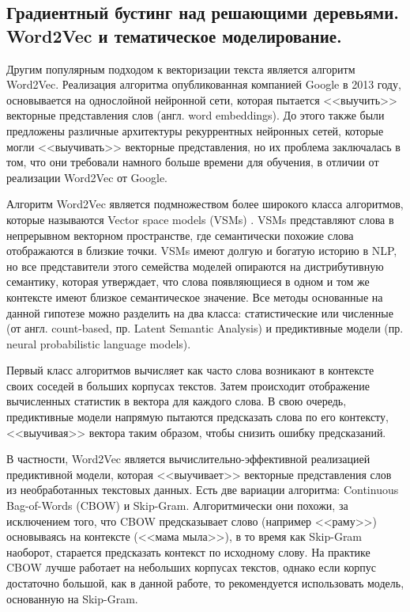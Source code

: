 \documentclass[a4paper, 14pt]{extarticle}
\begin{document}
\subsection{Градиентный бустинг над решающими деревьями. Word2Vec и тематическое моделирование.}
Другим популярным подходом к векторизации текста является алгоритм Word2Vec.
Реализация алгоритма опубликованная компанией Google \cite{DBLP:journals/corr/abs-1301-3781} в 2013 году,
основывается на однослойной нейронной сети, которая пытается <<выучить>> векторные представления слов (англ. word embeddings).
До этого также были предложены различные архитектуры рекуррентных нейронных сетей, которые могли <<выучивать>> векторные 
представления, но их проблема заключалась в том, что они требовали намного больше времени для обучения, в отличии от реализации 
Word2Vec от Google.

Алгоритм Word2Vec является подмножеством более широкого класса алгоритмов, которые называются Vector space models (VSMs) 
\cite{Salton:1975:VSM:361219.361220}. VSMs представляют слова в непрерывном векторном пространстве, где семантически похожие
слова отображаются в близкие точки. VSMs имеют долгую и богатую историю в NLP, но все представители этого семейства моделей 
опираются на дистрибутивную семантику, которая утверждает, что слова появляющиеся в одном и том же контексте имеют близкое 
семантическое значение. Все методы основанные на данной гипотезе можно разделить на два класса: статистические или численные (от 
англ. count-based, пр. Latent Semantic  Analysis) и предиктивные модели (пр. neural probabilistic language models).

Первый класс алгоритмов вычисляет как часто слова возникают в контексте своих соседей в больших корпусах текстов. Затем происходит 
отображение вычисленных статистик в вектора для каждого слова. В свою очередь, предиктивные модели напрямую пытаются предсказать 
слова по его контексту, <<выучивая>> вектора таким образом, чтобы снизить ошибку предсказаний.

В частности, Word2Vec является вычислительно-эффективной реализацией предиктивной модели, которая <<выучивает>> векторные 
представления слов из необработанных текстовых данных. Есть две вариации алгоритма: Continuous Bag-of-Words (CBOW) и Skip-Gram. 
Алгоритмически они  похожи, за  исключением того, что CBOW предсказывает слово (например <<раму>>) основываясь на контексте (<<мама 
мыла>>), в то время как Skip-Gram наоборот, старается предсказать контекст по исходному слову. На практике CBOW лучше работает на 
небольших корпусах текстов, однако если  корпус достаточно большой, как в данной работе, то рекомендуется использовать модель, 
основанную на Skip-Gram.
\end{document}

